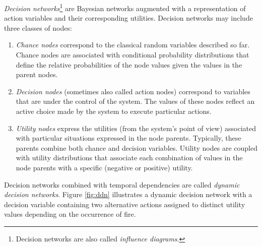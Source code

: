 \textit{Decision networks}\footnote{Decision networks are also called \textit{influence diagrams}.} are Bayesian networks augmented with a representation of action variables and their corresponding utilities. Decision networks may include three classes of nodes:
\begin{enumerate}
\item \textit{Chance nodes} correspond to the classical random variables described so far.  Chance nodes are associated with conditional probability distributions that define the relative probabilities of the node values given the values in the parent nodes.
\item \textit{Decision nodes} (sometimes also called action nodes) correspond to variables that are under the control of the system.  The values of these nodes reflect an active choice made by the system to execute particular actions.
\item \textit{Utility nodes} express the utilities (from the system's point of view) associated with particular situations expressed in the node parents.  Typically, these parents combine both chance and decision variables.   Utility nodes are coupled with utility distributions that associate each combination of values in the node parents with a specific (negative or positive) utility. 
\end{enumerate}

Decision networks combined with temporal dependencies are called \textit{dynamic decision networks}.  Figure \ref{fig:ddn} illustrates a dynamic decision network with a decision variable containing two alternative actions assigned to distinct utility values depending on the occurrence of fire. 

 
